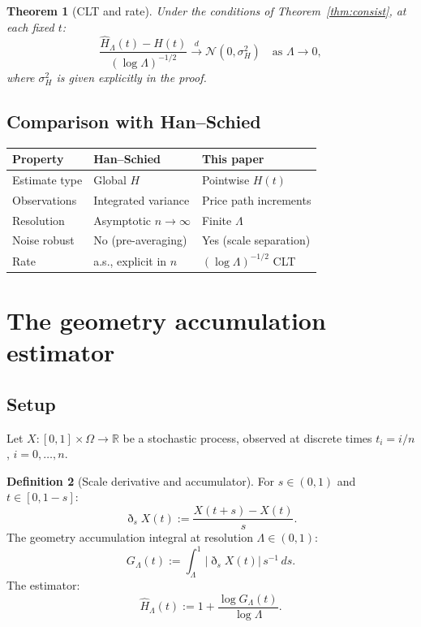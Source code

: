 \documentclass[11pt,a4paper]{article}
\newtheorem{theorem}{Theorem}[section]
\theoremstyle{definition}
\newtheorem{definition}[theorem]{Definition}
\theoremstyle{remark}
\newcommand{\R}{\mathbb{R}}
\newcommand{\GL}{G_\Lambda}
\newcommand{\Hhat}{\hat{H}_\Lambda}
\begin{document}
\begin{theorem}[CLT and rate]\label{thm:CLT}
Under the conditions of Theorem~\ref{thm:consist}, at each fixed $t$:
\[
  \frac{\Hhat(t)-H(t)}{(\log\Lambda)^{-1/2}}
  \xrightarrow{d} \mathcal{N}(0,\sigma_H^2)
  \quad\text{as }\Lambda\to0,
\]
where $\sigma_H^2$ is given explicitly in the proof.
\end{theorem}

\subsection{Comparison with Han--Schied}

\begin{center}
\begin{tabular}{lll}
\toprule
Property & Han--Schied \cite{hanschied2023} & This paper \\
\midrule
Estimate type & Global $H$ & Pointwise $H(t)$ \\
Observations & Integrated variance & Price path increments \\
Resolution & Asymptotic $n\to\infty$ & Finite $\Lambda$ \\
Noise robust & No (pre-averaging) & Yes (scale separation) \\
Rate & a.s., explicit in $n$ & $(\log\Lambda)^{-1/2}$ CLT \\
\bottomrule
\end{tabular}
\end{center}

\section{The geometry accumulation estimator}

\subsection{Setup}

Let $X:[0,1]\times\Omega\to\R$ be a stochastic process, observed at
discrete times $t_i=i/n$, $i=0,\dots,n$.

\begin{definition}[Scale derivative and accumulator]
For $s\in(0,1)$ and $t\in[0,1-s]$:
\[
  \eth_s X(t) := \frac{X(t+s)-X(t)}{s}.
\]
The geometry accumulation integral at resolution $\Lambda\in(0,1)$:
\[
  \GL(t) := \int_\Lambda^1|\eth_s X(t)|\,s^{-1}\,ds.
\]
The estimator:
\[
  \Hhat(t) := 1 + \frac{\log\GL(t)}{\log\Lambda}.
\]
\end{definition}
\end{document}
